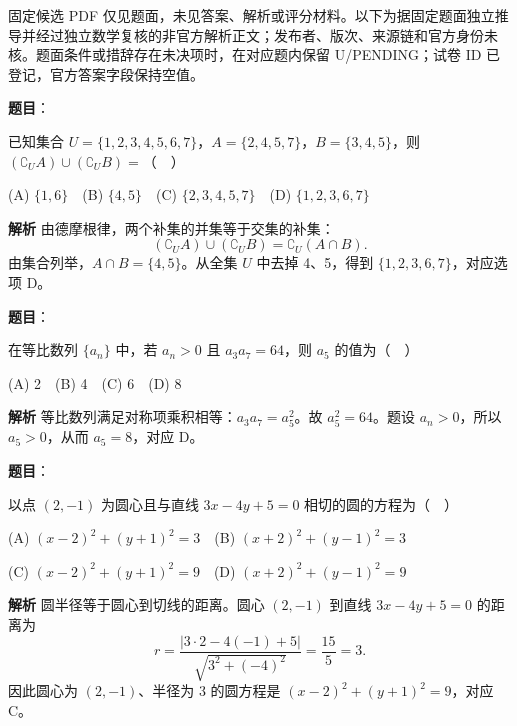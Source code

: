 

\begin{gktip}
固定候选 PDF 仅见题面，未见答案、解析或评分材料。以下为据固定题面独立推导并经过独立数学复核的非官方解析正文；发布者、版次、来源链和官方身份未核。题面条件或措辞存在未决项时，在对应题内保留 U/PENDING；试卷 ID 已登记，官方答案字段保持空值。
\end{gktip}

\begin{answer}

\textbf{题目}：

已知集合 \(U=\{1,2,3,4,5,6,7\}\)，\(A=\{2,4,5,7\}\)，\(B=\{3,4,5\}\)，则 \((\complement_U A)\cup(\complement_U B)=\)（　）

(A) \(\{1,6\}\)　(B) \(\{4,5\}\)　(C) \(\{2,3,4,5,7\}\)　(D) \(\{1,2,3,6,7\}\)

\textbf{解析}
由德摩根律，两个补集的并集等于交集的补集：
\nopagebreak[4]
\[
(\complement_U A)\cup(\complement_U B)=\complement_U(A\cap B).
\]
由集合列举，\(A\cap B=\{4,5\}\)。从全集 \(U\) 中去掉 4、5，得到 \(\{1,2,3,6,7\}\)，对应选项 D。


\end{answer}
\begin{answer}

\textbf{题目}：

在等比数列 \(\{a_n\}\) 中，若 \(a_n>0\) 且 \(a_3a_7=64\)，则 \(a_5\) 的值为（　）

(A) 2　(B) 4　(C) 6　(D) 8

\textbf{解析}
等比数列满足对称项乘积相等：\(a_3a_7=a_5^2\)。故 \(a_5^2=64\)。题设 \(a_n>0\)，所以 \(a_5>0\)，从而 \(a_5=8\)，对应 D。


\end{answer}
\begin{answer}

\textbf{题目}：

以点 \((2,-1)\) 为圆心且与直线 \(3x-4y+5=0\) 相切的圆的方程为（　）

(A) \((x-2)^2+(y+1)^2=3\)　(B) \((x+2)^2+(y-1)^2=3\)

(C) \((x-2)^2+(y+1)^2=9\)　(D) \((x+2)^2+(y-1)^2=9\)

\textbf{解析}
圆半径等于圆心到切线的距离。圆心 \((2,-1)\) 到直线 \(3x-4y+5=0\) 的距离为
\nopagebreak[4]
\[
r=\frac{|3\cdot2-4(-1)+5|}{\sqrt{3^2+(-4)^2}}=\frac{15}{5}=3.
\]
因此圆心为 \((2,-1)\)、半径为 3 的圆方程是 \((x-2)^2+(y+1)^2=9\)，对应 C。


\end{answer}
